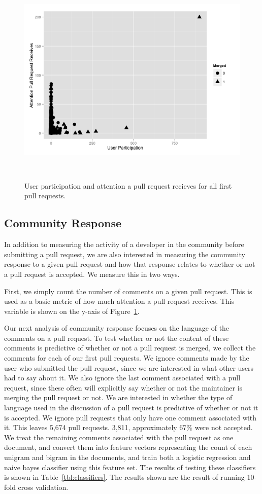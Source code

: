 \documentclass{sigchi}
\begin{document}
\begin{figure}[p] \centering
\includegraphics[scale=0.6]{figures/aprr_up_ggplot.png} \caption{User
participation and attention a pull request recieves for all first pull
requests.} \ \label{fig:aprr_up} \end{figure}

\subsection{Community Response}
In addition to measuring the activity of a developer in the community before
submitting a pull request, we are also interested in measuring the community
response to a given pull request and how that response relates to whether or not
a pull request is accepted. We measure this in two ways.

First, we simply count the number of comments on a given pull request. This is
used as a basic metric of how much attention a pull request receives. This
variable is shown on the y-axis of Figure~\ref{fig:aprr_up}.

Our next analysis of community response focuses on the language of the comments
on a pull request. To test whether or not the content of these comments is
predictive of whether or not a pull request is merged, we collect the comments
for each of our first pull requests. We ignore comments made by the user who
submitted the pull request, since we are interested in what other users had to
say about it. We also ignore the last comment associated with a pull request,
since these often will explicitly say whether or not the maintainer is merging
the pull request or not.  We are interested in whether the type of language used
in the discussion of a pull request is predictive of whether or not it is
accepted. We ignore pull requests that only have one comment associated with it.
This leaves 5,674 pull requests. 3,811, approximately 67\% were not accepted. We
treat the remaining comments associated with the pull request as one document,
and convert them into feature vectors representing the count of each unigram and
bigram in the documents, and train both a logistic regression and naive bayes
classifier using this feature set. The results of testing these classifiers is
shown in Table~\ref{tbl:classifiers}. The results shown are the result of
running 10-fold cross validation.
\end{document}
